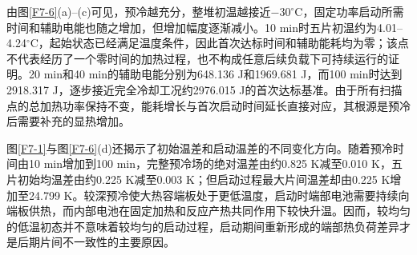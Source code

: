 \begin{table}[htbp]
    \centering
    \caption{不同预冷时间下固定恒功率启动的代表性结果}
    \vspace{0.3cm}
    \label{tab:q4:scan}
    \renewcommand{\arraystretch}{1.5}
\end{table}

由图\ref{F7-6}(a)--(c)可见，预冷越充分，整堆初温越接近\(-30^\circ\mathrm C\)，固定功率启动所需时间和辅助电能也随之增加，但增加幅度逐渐减小。10 min时五片初温约为4.01--4.24\(^\circ\mathrm C\)，起始状态已经满足温度条件，因此首次达标时间和辅助能耗均为零；该点不代表经历了一个零时间的加热过程，也不构成任意后续负载下可持续运行的证明。20 min和40 min的辅助电能分别为648.136 J和1969.681 J，而100 min时达到2918.317 J，逐步接近完全冷却工况约2976.015 J的首次达标基准。由于所有扫描点的总加热功率保持不变，能耗增长与首次启动时间延长直接对应，其根源是预冷后需要补充的显热增加。

图\ref{F7-1}与图\ref{F7-6}(d)还揭示了初始温差和启动温差的不同变化方向。随着预冷时间由10 min增加到100 min，完整预冷场的绝对温差由约0.825 K减至0.010 K，五片初始均温差由约0.225 K减至0.003 K；但启动过程最大片间温差却由0.225 K增加至24.799 K。较深预冷使大热容端板处于更低温度，启动时端部电池需要持续向端板供热，而内部电池在固定加热和反应产热共同作用下较快升温。因而，较均匀的低温初态并不意味着较均匀的启动过程，启动期间重新形成的端部热负荷差异才是后期片间不一致性的主要原因。

